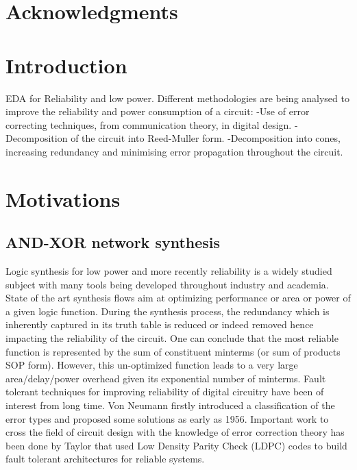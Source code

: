 \documentclass[12pt]{toptesi}
\begin{document}
\english
\begin{frontespizio*}
\end{frontespizio*}

\tableofcontents
\listoffigures
\listoftables


\chapter*{Acknowledgments}

\chapter{Introduction}

EDA for Reliability and low power.
Different methodologies are being analysed to improve the reliability and power consumption of a circuit:
-Use of error correcting techniques, from communication theory, in digital design.
-Decomposition of the circuit into Reed-Muller form.
-Decomposition into cones, increasing redundancy and minimising error propagation throughout the circuit. 

\chapter{Motivations}
    \section{AND-XOR network synthesis}
Logic synthesis for low power and more recently reliability is a widely studied subject with many tools being developed throughout industry and academia. State of the art synthesis flows aim at optimizing performance or area or power of a given logic function. During the synthesis process, the redundancy which is inherently captured in its truth table is reduced or indeed removed hence impacting the reliability of the circuit. One can conclude that the most reliable function is represented by the sum of constituent minterms (or sum of products SOP form). However, this un-optimized function leads to a very large area/delay/power overhead given its exponential number of minterms.  Fault tolerant techniques for improving  reliability of digital circuitry have been of interest from long time. Von Neumann \cite{Neumann56} firstly introduced a classification of the error types and proposed some solutions as early as 1956. Important work to cross the field of circuit design with the knowledge of error correction theory has been done by Taylor \cite{Taylor68a, Taylor68b} that used Low Density Parity Check (LDPC) codes to build fault tolerant architectures for reliable systems.
\end{document}
